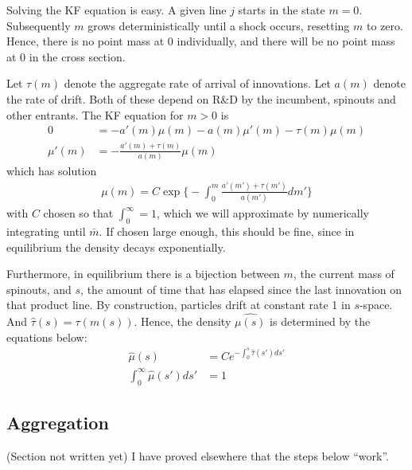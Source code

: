 \documentclass[12pt,english]{article}
\theoremstyle{remark}
\begin{document}
Solving the KF equation is easy. A given line $j$ starts in the state $m = 0$. Subsequently $m$ grows deterministically until a shock occurs, resetting $m$ to zero. Hence, there is no point mass at 0 individually, and there will be no point mass at 0 in the cross section. 

Let $\tau(m)$ denote the aggregate rate of arrival of innovations. Let $a(m)$ denote the rate of drift. Both of these depend on R\&D by the incumbent, spinouts and other entrants. The KF equation for $m > 0$ is 
\begin{align*}
	0 &= -a'(m)\mu(m) - a(m)\mu'(m) - \tau(m)\mu(m) \\
	\mu'(m) &= -\frac{a'(m) + \tau(m)}{a(m)} \mu(m)
\end{align*}
which has solution 
\begin{align*}
	\mu(m) = C\exp \Bigg\{ - \int_0^m \frac{a'(m') + \tau(m')}{a(m')} dm'    \Bigg\}
\end{align*}
with $C$ chosen so that $\int_0^{\infty} = 1$, which we will approximate by numerically integrating until $\bar{m}$. If chosen large enough, this should be fine, since in equilibrium the density decays exponentially. 

Furthermore, in equilibrium there is a bijection between $m$, the current mass of spinouts, and $s$, the amount of time that has elapsed since the last innovation on that product line. By construction, particles drift at constant rate 1 in $s$-space. And $\hat{\tau}(s) = \tau(m(s))$. Hence, the density $\hat{\mu(s)}$ is determined by the equations below:
\begin{align*}
	\hat{\mu}(s) &= Ce^{-\int_0^s \hat{\tau}(s')ds'} \\
	\int_0^{\infty} \hat{\mu}(s') ds' &= 1
\end{align*}

\subsection{Aggregation}

(Section not written yet) I have proved elsewhere that the steps below ``work''. 
\end{document}
